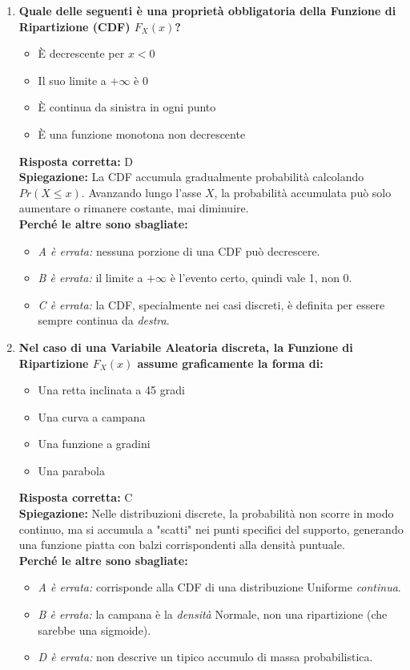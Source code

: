 \documentclass[12pt, a4paper]{article}
\begin{document}
\begin{enumerate}[label=\textbf{\arabic*.}]
    \item \textbf{Quale delle seguenti è una proprietà obbligatoria della Funzione di Ripartizione (CDF) $F_X(x)$?}
    \begin{itemize}
        \item[A)] È decrescente per $x < 0$
        \item[B)] Il suo limite a $+\infty$ è 0
        \item[C)] È continua da sinistra in ogni punto
        \item[D)] È una funzione monotona non decrescente
    \end{itemize}
    \textbf{Risposta corretta:} D \\
    \textbf{Spiegazione:} La CDF accumula gradualmente probabilità calcolando $Pr(X \le x)$. Avanzando lungo l'asse $X$, la probabilità accumulata può solo aumentare o rimanere costante, mai diminuire. \\
    \textbf{Perché le altre sono sbagliate:}
    \begin{itemize}
        \item \textit{A è errata:} nessuna porzione di una CDF può decrescere.
        \item \textit{B è errata:} il limite a $+\infty$ è l'evento certo, quindi vale 1, non 0.
        \item \textit{C è errata:} la CDF, specialmente nei casi discreti, è definita per essere sempre continua da \textit{destra}.
    \end{itemize}

    \item \textbf{Nel caso di una Variabile Aleatoria discreta, la Funzione di Ripartizione $F_X(x)$ assume graficamente la forma di:}
    \begin{itemize}
        \item[A)] Una retta inclinata a 45 gradi
        \item[B)] Una curva a campana
        \item[C)] Una funzione a gradini
        \item[D)] Una parabola
    \end{itemize}
    \textbf{Risposta corretta:} C \\
    \textbf{Spiegazione:} Nelle distribuzioni discrete, la probabilità non scorre in modo continuo, ma si accumula a "scatti" nei punti specifici del supporto, generando una funzione piatta con balzi corrispondenti alla densità puntuale. \\
    \textbf{Perché le altre sono sbagliate:}
    \begin{itemize}
        \item \textit{A è errata:} corrisponde alla CDF di una distribuzione Uniforme \textit{continua}.
        \item \textit{B è errata:} la campana è la \textit{densità} Normale, non una ripartizione (che sarebbe una sigmoide).
        \item \textit{D è errata:} non descrive un tipico accumulo di massa probabilistica.
    \end{itemize}


\end{enumerate}
\end{document}
